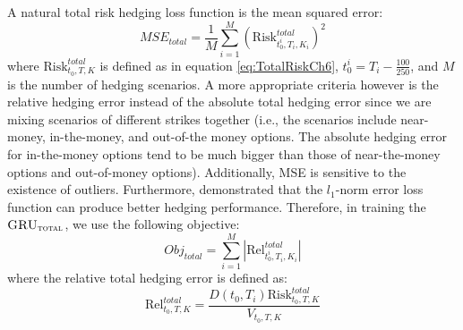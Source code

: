 \documentclass[letterpaper,12pt,titlepage,oneside,final]{book}
\numberwithin{equation}{section}
\theoremstyle{definition}
\newcommand{\model}{\textsc{GRU}_\delta}
\newcommand{\modelT}{\textsc{GRU}_{\textsc{total}}}
\newcommand{\modelL}{\textsc{GRU}_{\textsc{total}}^{\textsc{local}}}
\newcommand{\DS}{\Delta S}
\newcommand{\DT}{\Delta t}
\newcommand{\Smkt}{S}
\begin{document}
A natural total risk hedging loss function is the mean squared error:
\[
MSE_{total}=\frac{1}{M} \sum_{i=1}^M  (\text{Risk}^{total}_{t_0^i,T_i,K_i})^2
\]
where $\text{Risk}^{total}_{t_0,T,K}$ is defined as in equation \eqref{eq:TotalRiskCh6},  $t_0^i=T_i-\frac{100}{250}$, and $M$ is the number of hedging scenarios.
A more appropriate criteria however is the relative hedging error instead of the absolute total hedging error since we are mixing scenarios of different strikes together (i.e., the scenarios include near-money, in-the-money, and out-of-the money options. The absolute hedging error for in-the-money options tend to be much bigger than those of  near-the-money options and out-of-money options). Additionally, MSE is sensitive to the existence of outliers. Furthermore, \citet{coleman2007total} demonstrated that the  $l_1$-norm error loss function can produce better hedging performance. 
Therefore, in training the $\modelT$, we use the following objective:
\begin{equation}
Obj_{total}=\sum_{i=1}^M \left|\text{Rel}^{total}_{t_0^{i},T_i,K_i}\right|
\label{eq:totalObjLinear}
\end{equation}
where the relative total hedging error is defined as:
\begin{equation}
\text{Rel}^{total}_{t_0,T,K}
=\frac{D(t_0,T_i)  \text{Risk}^{total}_{t_0,T,K}}{V_{t_0,T,K}}
\label{eq:relHError}
\end{equation}


%
%
\end{document}
